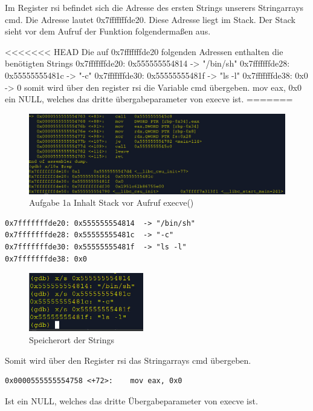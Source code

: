 \documentclass[12pt]{article}
\begin{document}
Im Register rsi befindet sich die Adresse
des ersten Strings unserers Stringarrays cmd.
Die Adresse lautet 0x7fffffffde20. 
Diese Adresse liegt im Stack. 
Der Stack sieht vor dem Aufruf der Funktion folgendermaßen aus.

<<<<<<< HEAD
Die auf  0x7fffffffde20 folgenden Adressen enthalten die ben\"otigten Strings
0x7fffffffde20: 0x555555554814  -> "/bin/sh"
0x7fffffffde28: 0x55555555481c	-> "-c"
0x7fffffffde30: 0x55555555481f	-> "ls -l"
0x7fffffffde38: 0x0		-> 0
somit wird \"uber den register rsi die Variable cmd \"ubergeben.
mov eax, 0x0 
ein NULL, welches das dritte \"ubergabeparameter 
von execve ist.
=======
\begin{figure}[h!]
	\includegraphics[width=15cm]{../images/Bufferoverflow_Aufgabe1a_StackVorCallExecve.jpg}
	\caption{Aufgabe 1a Inhalt Stack vor Aufruf execve()}
\end{figure}



\begin{lstlisting}
0x7fffffffde20: 0x555555554814  -> "/bin/sh"
0x7fffffffde28: 0x55555555481c	-> "-c"
0x7fffffffde30: 0x55555555481f	-> "ls -l"
0x7fffffffde38: 0x0
\end{lstlisting}
\begin{figure}[h!]
	\includegraphics[width=5cm]{../images/Bufferoverflow_Aufgabe1a_Pointeruebergabeparams.jpg}
	\caption{Speicherort der Strings}
\end{figure}
Somit wird über den Register rsi das Stringarrays cmd übergeben.

\newpage
\begin{lstlisting}
0x0000555555554758 <+72>:    mov eax, 0x0 
\end{lstlisting}
Ist ein NULL, welches das dritte Übergabeparameter von execve ist.
\end{document}
